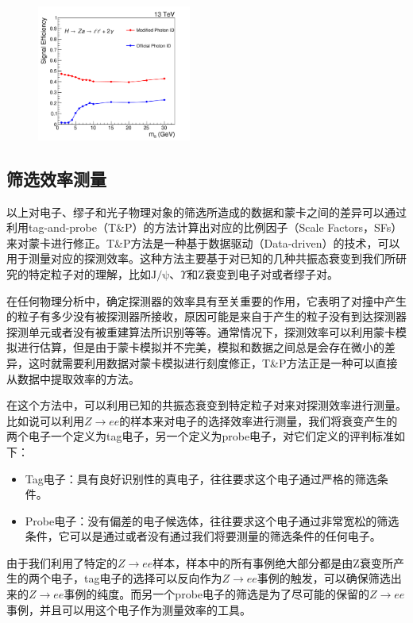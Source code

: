 \begin{figure}[htbp]
  \begin{center}
    \includegraphics[width=0.45\textwidth]{figures/chapter04/ID_eff.png} \\
    \label{fig:IDCorr_eff}
\end{center}
\end{figure}


\subsection{筛选效率测量}\label{subsec:PhoTagProbe}

以上对电子、缪子和光子物理对象的筛选所造成的数据和蒙卡之间的差异可以通过利用tag-and-probe（T\&P）的方法计算出对应的比例因子（Scale Factors，SFs）来对蒙卡进行修正。T\&P方法是一种基于数据驱动（Data-driven）的技术，可以用于测量对应的探测效率。这种方法主要基于对已知的几种共振态衰变到我们所研究的特定粒子对的理解，比如$\mathrm{J/\psi}$、$\Upsilon$和Z衰变到电子对或者缪子对。

在任何物理分析中，确定探测器的效率具有至关重要的作用，它表明了对撞中产生的粒子有多少没有被探测器所接收，原因可能是来自于产生的粒子没有到达探测器探测单元或者没有被重建算法所识别等等。通常情况下，探测效率可以利用蒙卡模拟进行估算，但是由于蒙卡模拟并不完美，模拟和数据之间总是会存在微小的差异，这时就需要利用数据对蒙卡模拟进行刻度修正，T\&P方法正是一种可以直接从数据中提取效率的方法。

在这个方法中，可以利用已知的共振态衰变到特定粒子对来对探测效率进行测量。比如说可以利用$Z\rightarrow ee$的样本来对电子的选择效率进行测量，我们将衰变产生的两个电子一个定义为tag电子，另一个定义为probe电子，对它们定义的评判标准如下：

\begin{itemize}
    \item Tag电子：具有良好识别性的真电子，往往要求这个电子通过严格的筛选条件。
    \item Probe电子：没有偏差的电子候选体，往往要求这个电子通过非常宽松的筛选条件，它可以是通过或者没有通过我们将要测量的筛选条件的任何电子。
\end{itemize}
由于我们利用了特定的$Z\rightarrow ee$样本，样本中的所有事例绝大部分都是由Z衰变所产生的两个电子，tag电子的选择可以反向作为$Z\rightarrow ee$事例的触发，可以确保筛选出来的$Z\rightarrow ee$事例的纯度。而另一个probe电子的筛选是为了尽可能的保留的$Z\rightarrow ee$事例，并且可以用这个电子作为测量效率的工具。


